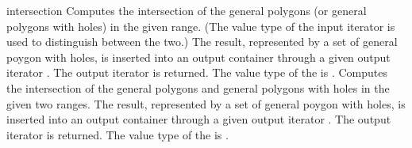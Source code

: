 \begin{ccRefFunction}{intersection}
{Computes the intersection of the general polygons (or general polygons with
holes) in the given range. (The value type of the input iterator is
used to distinguish between the two.) The result, represented by a set
of general poygon with holes, is inserted into an output container
through a given output iterator . The output iterator is
returned. The value type of the  is
.}
\ccGlue
{}
{Computes the intersection of the general polygons and general polygons
with holes in the given two ranges. The result, represented by a set
of general poygon with holes, is inserted into an output container
through a given output iterator . The output iterator is
returned. The value type of the  is
.}

\ccSeeAlso
{}\\
\\
\\

\end{ccRefFunction}

\ccRefPageEnd
